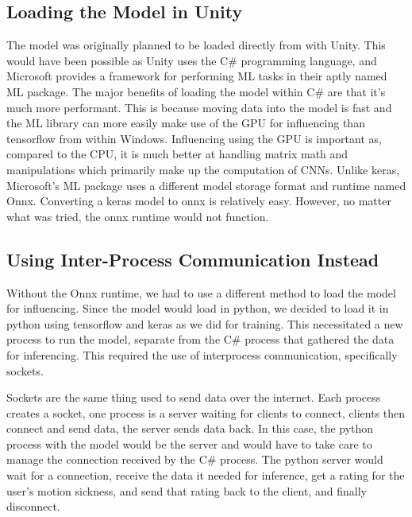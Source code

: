 \subsection{Loading the Model in Unity}
\label{subsec:loading}

The model was originally planned to be loaded directly from with Unity.
This would have been possible as Unity uses the C\# programming language, and Microsoft provides a framework for performing ML tasks in their aptly named ML package.
The major benefits of loading the model within C\# are that it's much more performant.
This is because moving data into the model is fast and the ML library can more easily make use of the GPU for influencing than tensorflow from within Windows. %
Influencing using the GPU is important as, compared to the CPU, it is much better at handling matrix math and manipulations which primarily make up the computation of CNNs.
Unlike keras, Microsoft's ML package uses a different model storage format and runtime named Onnx.
Converting a keras model to onnx is relatively easy.
However, no matter what was tried, the onnx runtime would not function.

\subsection{Using Inter-Process Communication Instead}
\label{subsec:ipc}

Without the Onnx runtime, we had to use a different method to load the model for influencing.
Since the model would load in python, we decided to load it in python using tensorflow and keras as we did for training.
This necessitated a new process to run the model, separate from the C\# process that gathered the data for inferencing.
This required the use of interprocess communication, specifically sockets.

Sockets are the same thing used to send data over the internet.
Each process creates a socket, one process is a server waiting for clients to connect, clients then connect and send data, the server sends data back.
In this case, the python process with the model would be the server and would have to take care to manage the connection received by the C\# process.
The python server would wait for a connection, receive the data it needed for inference, get a rating for the user's motion sickness, and send that rating back to the client, and finally disconnect.

